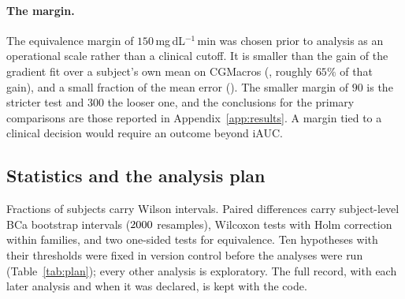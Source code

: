 \paragraph{The margin.}
The equivalence margin of $150$\,mg\,dL$^{-1}$\,min was chosen prior to analysis as an operational scale rather than a clinical cutoff. It is smaller than the gain of the
gradient fit over a subject's own mean on CGMacros (\resDiffGradThreeVsPersonalMean{}, roughly $65\%$ of that gain), and a small fraction of the mean
error (\resMaeGradThree{}). The smaller margin of $90$ is the stricter test and $300$ the looser one, and the
conclusions for the primary comparisons are those reported in Appendix~\ref{app:results}. A margin
tied to a clinical decision would require an outcome beyond iAUC.

\subsection{Statistics and the analysis plan}
\label{sec:plan}

Fractions of subjects carry Wilson intervals. Paired differences carry subject-level BCa bootstrap intervals
($2000$ resamples), Wilcoxon tests with Holm correction within families, and two one-sided tests for
equivalence. Ten hypotheses with their thresholds were fixed in version control before the analyses were run
(Table~\ref{tab:plan}); every other analysis is exploratory. The full record, with each later analysis and when it was
declared, is kept with the code.
